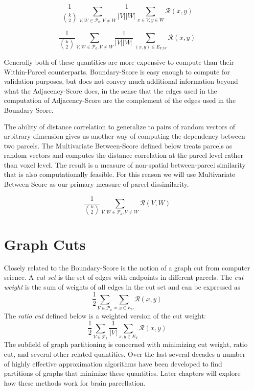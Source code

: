 \begin{definition} \label{between-score}
\[ \frac{1}{\binom{k}{2}} \sum_{V, W \in \mathcal{P}_k, V \neq W}
   \frac{1}{|V||W|} \sum_{x \in V, y \in W} \mathcal{R}(x,y)
\]
\end{definition}

\begin{definition} \label{boundary-score}
\[ \frac{1}{\binom{k}{2}} \sum_{V, W \in \mathcal{P}_k, V \neq W}
   \frac{1}{|V||W|} \sum_{(x,y) \in E_{V,W}} \mathcal{R}(x,y)
\]
\end{definition}

Generally both of these quantities are more expensive to compute than
their Within-Parcel counterparts. Boundary-Score is easy enough to
compute for validation purposes, but does not convey much additional
information beyond what the Adjacency-Score does, in the sense that
the edges used in the computation of Adjacency-Score are the complement
of the edges used in the Boundary-Score.

The ability of distance correlation to generalize to pairs of random
vectors of arbitrary dimension gives us another way of computing
the dependency between two parcels. The Multivariate Between-Score
defined below treats parcels as random vectors and computes the distance
correlation at the parcel level rather than voxel level. The result is
a measure of non-spatial between-parcel similarity that is also
computationally feasible. For this reason we will use Multivariate
Between-Score as our primary measure of parcel dissimilarity.

\begin{definition}
\label{multi-between-score}
\[ \frac{1}{\binom{k}{2}} \sum_{V, W \in \mathcal{P}_k, V \neq W}
   \mathcal{R}(V, W)
\]
\end{definition}


\section{Graph Cuts}

Closely related to the Boundary-Score is the notion of a graph cut from
computer science. A \textit{cut set} is the set of edges with endpoints
in different parcels. The \textit{cut weight} is the sum of weights of
all edges in the cut set and can be expressed as
\[ \frac{1}{2} \sum_{V \in \mathcal{P}_k}
   \sum_{x,y \in E_V} \mathcal{R}(x,y) \]
The \textit{ratio cut} defined below is a weighted version of the cut
weight:
\[ \frac{1}{2} \sum_{V \in \mathcal{P}_k} \frac{1}{|V|}
   \sum_{x,y \in E_V} \mathcal{R}(x,y)
\]
The subfield of graph partitioning is concerned with minimizing
cut weight, ratio cut, and several other related quantities. Over the
last several decades a number of highly effective approximation
algorithms have been developed to find partitions of graphs that
minimize these quantities. Later chapters will explore how these methods
work for brain parcellation.

